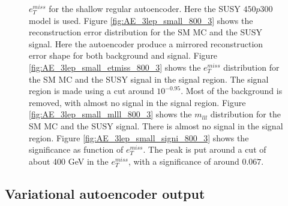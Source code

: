 \begin{figure}[H]
{    $e_T^{miss}$ for the shallow regular autoencoder. Here the SUSY $450p300$ model is used.
    Figure \ref{fig:AE_3lep_small_800_3} shows the reconstruction error 
    distribution for the SM MC and the SUSY signal. Here the autoencoder produce a mirrored reconstruction error shape for both background and 
    signal. Figure \ref{fig:AE_3lep_small_etmiss_800_3} shows the $e_T^{miss}$ distribution for the SM MC and the SUSY signal in the signal region. 
    The signal region is made using a cut around $10^{-0.95}$. Most of the background is removed, with almost no signal in the signal region.
    Figure \ref{fig:AE_3lep_small_mlll_800_3} shows the $m_{lll}$ distribution for the SM MC and the SUSY signal. 
    There is almost no signal in the signal region. Figure \ref{fig:AE_3lep_small_signi_800_3} shows the significance as function of
    $e_T^{miss}$. The peak is put around a cut of about 400 GeV in the $e_T^{miss}$, with a significance of around $0.067$.}
    \label{fig:AE_3lep_small_rec_sig_signi_800_3}
\end{figure}










\subsection*{Variational autoencoder output}












